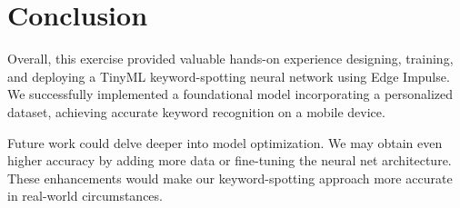\documentclass{article}
\begin{document}
\section{Conclusion}
\label{sec:conclusion}

Overall, this exercise provided valuable hands-on experience designing, training, and deploying a TinyML keyword-spotting neural network using Edge Impulse. We successfully implemented a foundational model incorporating a personalized dataset, achieving accurate keyword recognition on a mobile device.

Future work could delve deeper into model optimization. We may obtain even higher accuracy by adding more data or fine-tuning the neural net architecture. These enhancements would make our keyword-spotting approach more accurate in real-world circumstances.

\printbibliography
\end{document}
